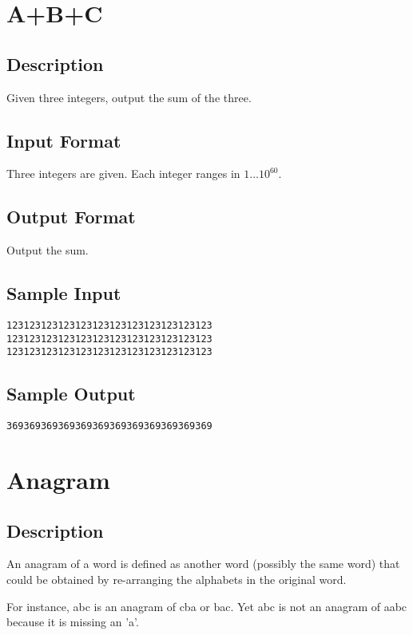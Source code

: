 \section{A+B+C}

\subsection*{Description}
Given three integers, output the sum of the three. 

\subsection*{Input Format}
Three integers are given.  Each integer ranges in $1 \dots 10^{60}$. 

\subsection*{Output Format}
Output the sum.

\subsection*{Sample Input}
\begin{verbatim}
123123123123123123123123123123123123
123123123123123123123123123123123123
123123123123123123123123123123123123
\end{verbatim}

\subsection*{Sample Output}
\begin{verbatim}
369369369369369369369369369369369369
\end{verbatim}

\newpage



\section{Anagram}

\subsection*{Description}
An anagram of a word is defined as another word (possibly the same word) that could be obtained by re-arranging the alphabets in the original word.

For instance, abc is an anagram of cba or bac. Yet abc is not an anagram of aabc because it is missing an 'a'.

